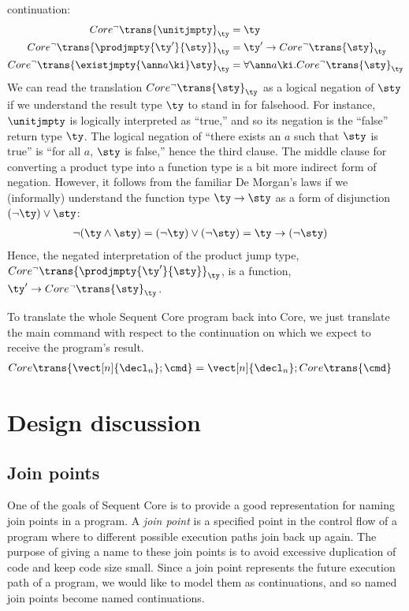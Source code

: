 \documentclass{article}
\begin{document}
continuation:
\begin{align*}
  Core^\neg\trans{\unitjmpty}_{\ty} &= \ty
  \\
  Core^\neg\trans{\prodjmpty{\ty'}{\sty}}_{\ty}
  &=
  \ty' \to Core^\neg\trans{\sty}_{\ty}
  \\
  Core^\neg\trans{\existjmpty{\ann a \ki} \sty}_{\ty}
  &=
  \forall \ann a \ki. Core^\neg\trans{\sty}_{\ty}
\end{align*}
We can read the translation $Core^\neg\trans{\sty}_{\ty}$ as a logical negation
of $\sty$ if we understand the result type $\ty$ to stand in for falsehood.  For
instance, $\unitjmpty$ is logically interpreted as ``true,'' and so its negation
is the ``false'' return type $\ty$.  The logical negation of ``there exists an
$a$ such that $\sty$ is true'' is ``for all $a$, $\sty$ is false,'' hence the
third clause.  The middle clause for converting a product type into a function
type is a bit more indirect form of negation.  However, it follows from the
familiar De Morgan's laws if we (informally) understand the function type
$\ty \to \sty$ as a form of disjunction $(\neg \ty) \vee \sty$:
\begin{align*}
  \neg(\ty \wedge \sty)
  &=
  (\neg \ty) \vee (\neg \sty)
  =
  \ty \to (\neg \sty)
\end{align*}
Hence, the negated interpretation of the product jump type,
$Core^\neg\trans{\prodjmpty{\ty'}{\sty}}_{\ty}$, is a function,
$\ty' \to Core^\neg\trans{\sty}_{\ty}$.

To translate the whole Sequent Core program back into Core, we just translate
the main command with respect to the continuation on which we expect to receive
the program's result.
\begin{align*}
  Core\trans{\vect[n]{\decl_n}; \cmd}%
  &=
  \vect[n]{\decl_n}; Core\trans{\cmd}%
\end{align*}

\section{Design discussion}
\label{sec:design-discussion}

\subsection{Join points}

One of the goals of Sequent Core is to provide a good representation for naming
join points in a program.  A \emph{join point} is a specified point in the
control flow of a program where to different possible execution paths join back
up again.  The purpose of giving a name to these join points is to avoid
excessive duplication of code and keep code size small.  Since a join point
represents the future execution path of a program, we would like to model them
as continuations, and so named join points become named continuations.
\end{document}
